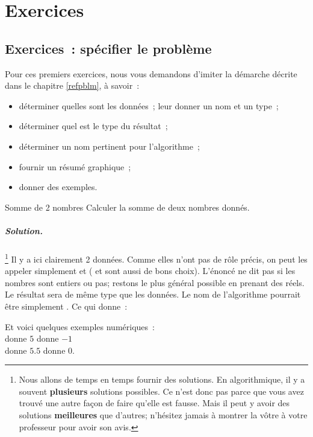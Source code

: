 \chapter{Exercices}

\minitoc

\clearpage
\section{Exercices~: spécifier le problème}
\label{annexe-specifier}

Pour ces premiers exercices, nous vous demandons d’imiter la démarche décrite
dans le chapitre \ref{refpblm}, à savoir~:

\begin{itemize}
	\item déterminer quelles sont les données~;
		leur donner un nom et un type~;
	\item déterminer quel est le type du résultat~;
	\item déterminer un nom pertinent pour l’algorithme~;
	\item fournir un résumé graphique~;
	\item donner des exemples.
\end{itemize}

\begin{Exercice}{Somme de 2 nombres}
	Calculer la somme de deux nombres donnés.
	\paragraph{Solution.}%
	\footnote{%
		Nous allons de temps en temps 
		fournir des solutions.
		En algorithmique,
		il y a souvent \textbf{plusieurs} solutions possibles.
		Ce n’est donc pas parce que vous avez trouvé une autre façon de faire qu'elle est fausse.
		Mais il peut y avoir des solutions \textbf{meilleures}
		que d’autres; 
		n’hésitez jamais à montrer la vôtre
		à votre professeur pour avoir son avis.
	}
	Il y a ici clairement 2 données.
	Comme elles n’ont pas de rôle précis,
	on peut les appeler simplement 
	et 
	( et  sont aussi de bons choix).
	L’énoncé ne dit pas si les nombres sont entiers ou pas;
	restons le plus général possible en prenant des réels.
	Le résultat sera de même type que les données.
	Le nom de l’algorithme pourrait être simplement .
	Ce qui donne~:
	\begin{center}
	\end{center}			 
	Et voici quelques exemples numériques~:	\\
	 donne $5$      \quad
	 donne $-1$    \\
	 donne $5.5$  \quad
	 donne $0$.
\end{Exercice}

